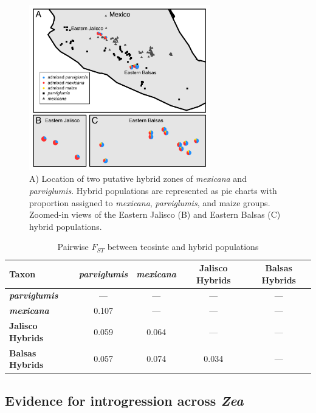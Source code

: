 \begin{figure}[h!]
  \centering
   \includegraphics[width=0.7\textwidth]{map.pdf}
    \caption{A) Location of two putative hybrid zones of \emph{mexicana} and \emph{parviglumis}.  Hybrid populations are represented as pie charts with proportion assigned to \emph{mexicana}, \emph{parviglumis}, and maize groups. Zoomed-in views of the Eastern Jalisco (B) and Eastern Balsas (C) hybrid populations.} 
\label{fig:pies}
\end{figure}

\begin{table}[h!]
\begin{center}
\caption{Pairwise $F_{ST}$ between teosinte and hybrid populations} \label{tab:Fst}
\begin{tabular}{lcccc}\\\toprule
{\bf Taxon}&{\bf \emph{parviglumis}}&{\bf \emph{mexicana}}&{\bf Jalisco Hybrids}&{\bf Balsas Hybrids}\\\midrule
{\bf \emph{parviglumis}}&---&---&---&---\\
{\bf \emph{mexicana}}&0.107&---&---&---\\
{\bf Jalisco Hybrids}&0.059&0.064&---&---\\
{\bf Balsas Hybrids}&0.057&0.074&0.034&---\\\bottomrule
\end{tabular}
\end{center}
\end{table} 

\subsection*{Evidence for introgression across \emph{Zea}}

